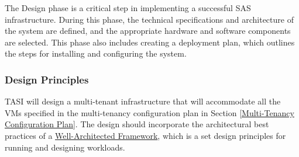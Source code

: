 The Design phase is a critical step in implementing a successful SAS infrastructure. During this phase, the technical specifications and architecture of the system are defined, and the appropriate hardware and software components are selected. This phase also includes creating a deployment plan, which outlines the steps for installing and configuring the system.

\subsubsection{Design Principles}

TASI will design a multi-tenant infrastructure that will accommodate all the VMs specified in the multi-tenancy configuration plan in Section \ref{Multi-Tenancy Configuration Plan}. The design should incorporate the architectural best practices of a \href{https://learn.microsoft.com/en-us/azure/well-architected/}{Well-Architected Framework}, which is a set design principles for running and designing workloads.

